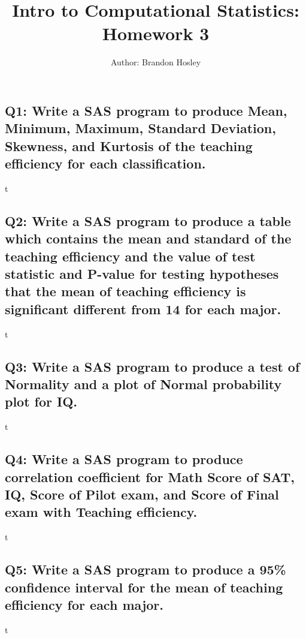 \documentclass[a4paper,man,natbib]{apa6}
\title{Intro to Computational Statistics: Homework 3}
\author{Author: Brandon Hosley}
\affiliation{Instructor: Liang Kong, Ph.D}
\begin{document}
\maketitle
\singlespacing
	
\subsection*{Q1: Write a SAS program to produce Mean, Minimum, Maximum, Standard Deviation, Skewness, and Kurtosis of the teaching efficiency for each classification. }
t

\subsection*{Q2: Write a SAS program to produce a table which contains the mean and standard of the teaching efficiency and the value of test statistic and P-value for testing hypotheses that the mean of teaching efficiency is significant different from 14 for each major. }
t

\subsection*{Q3: Write a SAS program to produce a test of Normality and a plot of Normal probability plot for IQ. }
t

\subsection*{Q4: Write a SAS program to produce correlation coefficient for Math Score of SAT, IQ, Score of Pilot exam, and Score of Final exam with Teaching efficiency. }
t

\subsection*{Q5: Write a SAS program to produce  a 95\% confidence interval for the mean of teaching efficiency for each major. }
t
\end{document}
